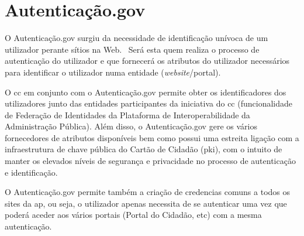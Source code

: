 




\section{Autenticação.gov}
O Autenticação.gov surgiu da necessidade de identificação unívoca de um utilizador perante sítios na Web.~\cite{agov} Será esta quem realiza o processo de autenticação do utilizador e que fornecerá os atributos do utilizador necessários para identificar o utilizador numa entidade (\textit{website}/portal).

O \acrshort{cc} em conjunto com o Autenticação.gov permite obter os identificadores dos utilizadores junto das entidades participantes da iniciativa do \acrshort{cc} (funcionalidade de Federação de Identidades da Plataforma de Interoperabilidade da Administração Pública). Além disso, o Autenticação.gov gere os vários fornecedores de atributos disponíveis bem como possui uma estreita ligação com a infraestrutura de chave pública do Cartão de Cidadão (\acrfull{pki}), com o intuito de manter os elevados níveis de segurança e privacidade no processo de autenticação e identificação.~\cite{agov}

O Autenticação.gov permite também a criação de credencias comuns a todos os sites da \acrshort{ap}, ou seja, o utilizador apenas necessita de se autenticar uma vez que poderá aceder aos vários portais (Portal do Cidadão, etc) com a mesma autenticação.

